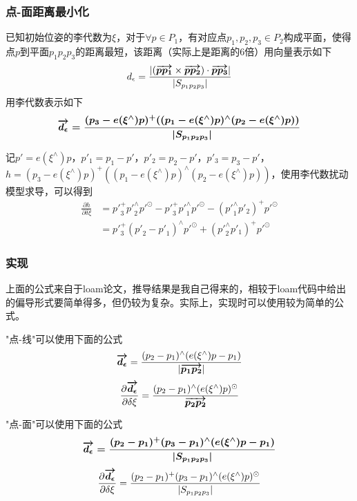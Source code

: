 \documentclass{ctexart}
\begin{document}
{	\subsubsection{点-面距离最小化}
	已知初始位姿的李代数为$\xi$，对于$\forall p \in P_1$，有对应点$p_1,p_2,p_3 \in P_2$构成平面，使得点$p$到平面$p_1p_2p_3$的距离最短，该距离（实际上是距离的6倍）用向量表示如下
	\begin{equation}
	d_{\epsilon} =
	\frac{|(\boldmath\overrightarrow{p p_1}\unboldmath \times \boldmath\overrightarrow{p p_2}\unboldmath) \cdot \boldmath\overrightarrow{p p_3}\unboldmath|}{|S_{p_1 p_2 p_3}|}
	\end{equation}
	用李代数表示如下
	\begin{equation}
	\boldmath\overrightarrow{d_{\epsilon}}\unboldmath =
	\frac{
		(p_3-e(\xi ^\wedge)p)
		^{+}(
		(p_1-e(\xi ^\wedge)p) 
		^\wedge 
		(p_2-e(\xi ^\wedge)p))
		}{|S_{p_1 p_2 p_3}|}
	\end{equation}
	\par 记$p'=e(\xi ^\wedge)p$，$p'_1=p_1-p'$，$p'_2=p_2-p'$，$p'_3=p_3-p'$，$h=(p_3-e(\xi ^\wedge)p)
	^{+}(
	(p_1-e(\xi ^\wedge)p) 
	^\wedge 
	(p_2-e(\xi ^\wedge)p))$，使用李代数扰动模型求导，可以得到
	\begin{equation}
	\begin{split}
	\frac{\partial h}{\partial \delta \xi}
	&=
	{p'}_3^{+} {p'}_2^\wedge p'^\odot -
	{p'}_3^{+} {p'}_1^\wedge p'^\odot -
	({p'}_1^\wedge p'_2)^{+} p'^\odot \\
	&=
	{p'}_3^{+} ({p'}_2-{p'}_1)^\wedge p'^\odot + ({p'}_2^\wedge p'_1)^{+} p'^\odot
	\end{split}
	\end{equation}
	
	\subsubsection{实现}
	上面的公式来自于loam论文，推导结果是我自己得来的，相较于loam代码中给出的偏导形式要简单得多，但仍较为复杂。实际上，实现时可以使用较为简单的公式。
	\par "点-线"可以使用下面的公式
	\begin{equation}
	\boldmath\overrightarrow{d_{\epsilon}}\unboldmath =
	\frac{(p_2-p_1)^\wedge(e(\xi ^\wedge)p-p_1)}{|\boldmath\overrightarrow{p_1 p_2}\unboldmath|}
	\end{equation}
	\begin{equation}
	\frac{\partial \boldmath\overrightarrow{d_{\epsilon}}\unboldmath}{\partial\delta\xi}
	=
	\frac{(p_2-p_1)^\wedge(e(\xi^\wedge)p)^\odot}{\boldmath\overrightarrow{p_2p_2}\unboldmath}
	\end{equation}
	
	\par "点-面"可以使用下面的公式
	\begin{equation}
	\boldmath\overrightarrow{d_{\epsilon}}\unboldmath =
	\frac{(p_2-p_1)^{+}(p_3-p_1)^\wedge(e(\xi ^\wedge)p-p_1)}{|S_{p_1 p_2 p_3}|}
	\end{equation}
	\begin{equation}
	\frac{\partial \boldmath\overrightarrow{d_{\epsilon}}\unboldmath}{\partial\delta\xi}
	=
	\frac{(p_2-p_1)^{+}(p_3-p_1)^\wedge(e(\xi ^\wedge)p)^\odot}{|S_{p_1 p_2 p_3}|}
	\end{equation}
	
}
\end{document}
